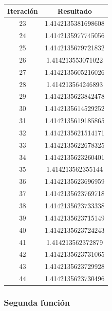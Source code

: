 \documentclass[titlepage,a4paper]{article}
\begin{document}
\begin{multicols}{2}
\begin{center}
\begin{tabular}{| c | c |}
\hline   
 Iteración & Resultado \\ \hline
23     &  1.4142135381698608 \\
24     &  1.4142135977745056 \\
25     &  1.4142135679721832 \\
26     &  1.414213553071022 \\
27     &  1.4142135605216026 \\
28     &  1.414213564246893 \\
29     &  1.4142135623842478 \\
30     &  1.4142135614529252 \\
31     &  1.4142135619185865 \\
32     &  1.4142135621514171 \\
33     &  1.4142135622678325 \\
34     &  1.4142135623260401 \\
35     &  1.414213562355144 \\
36     &  1.4142135623696959 \\
37     &  1.4142135623769718 \\
38     &  1.4142135623733338 \\
39     &  1.4142135623715149 \\
40     &  1.4142135623724243 \\
41     &  1.414213562372879 \\
42     &  1.4142135623731065 \\
43     &  1.4142135623729928 \\
44     &  1.4142135623730496 \\
        \hline
    \end{tabular}
\end{center}
\end{multicols}
\subsubsection{Segunda función}\label{sec:bis2}
\end{document}
